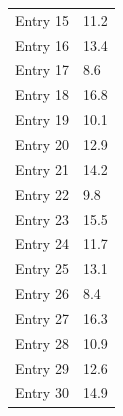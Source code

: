 \begin{longtable}{ll}
Entry 15 & 11.2 \\
Entry 16 & 13.4 \\
Entry 17 & 8.6  \\
Entry 18 & 16.8 \\
Entry 19 & 10.1 \\
Entry 20 & 12.9 \\
Entry 21 & 14.2 \\
Entry 22 & 9.8  \\
Entry 23 & 15.5 \\
Entry 24 & 11.7 \\
Entry 25 & 13.1 \\
Entry 26 & 8.4  \\
Entry 27 & 16.3 \\
Entry 28 & 10.9 \\
Entry 29 & 12.6 \\
Entry 30 & 14.9 \\
\end{longtable}


